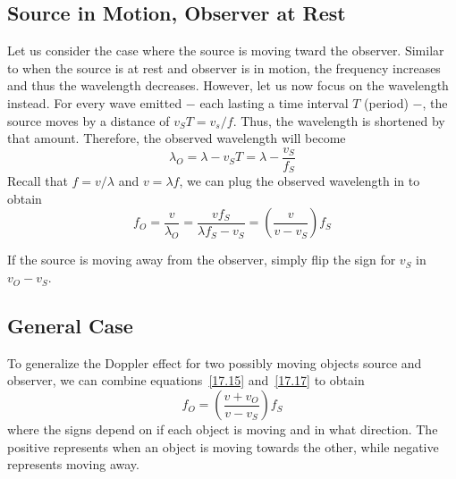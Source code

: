 \subsection{Source in Motion, Observer at Rest}

Let us consider the case where the source is moving tward the observer.
Similar to when the source is at rest and observer is in motion, the frequency increases and thus 
the wavelength decreases. However, let us now focus on the wavelength instead. For every wave emitted
$-$ each lasting a time interval $T$ (period) $-$, the source moves by a distance of $v_S T = v_s/f$.
Thus, the wavelength is shortened by that amount. Therefore, the observed wavelength will become 
\begin{equation}
\lambda_O = \lambda - v_S T = \lambda - \frac{v_S}{f_S}
\end{equation}
Recall that $f = v/\lambda$ and $v = \lambda f$, we can plug the observed wavelength in to obtain 
\begin{equation}\label{17.17}
f_O = \frac{v}{\lambda_O} = \frac{v f_S}{\lambda f_S - v_S}
    = \left(\frac{v}{v - v_S}\right)f_S
\end{equation}

If the source is moving away from the observer, simply flip the sign for $v_S$ in $v_O - v_S$.

\subsection{General Case}

To generalize the Doppler effect for two possibly moving objects source and observer, we can combine
equations~\eqref{17.15} and~\eqref{17.17} to obtain 
\begin{equation}\label{17.19}
    f_O = \left(\frac{v + v_O}{v - v_S}\right)f_S
\end{equation}
where the signs depend on if each object is moving and in what direction. The positive represents
when an object is moving towards the other, while negative represents moving away.